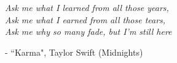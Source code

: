 \begin{center}
    \textit{Ask me what I learned from all those years, \\ Ask me what I earned from all those tears, \\ Ask me why so many fade, but I'm still here}
\end{center}
\begin{flushright}
- ``Karma", Taylor Swift (Midnights)
\end{flushright}
\restoregeometry